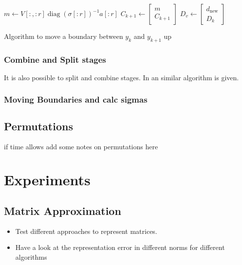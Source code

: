 \documentclass[doctype=mastersthesis,BCOR=15mm,biblatex]{ldvbook}%
\DeclareMathOperator{\diag}{diag}
\begin{document}
\begin{algorithm}[htb]
\begin{algorithmic}
\Else
\State $m \gets V[:,:r] \diag(\sigma[:r])^{-1} a[:r]$
\State $C_{k+1} \gets \begin{bmatrix} m\\C_{k+1} \end{bmatrix}$
\EndIf
\State $D_v \gets \begin{bmatrix}
d_{\text{new}} \\D_k
\end{bmatrix}$
	\end{algorithmic}
	\caption{Algorithm to move a boundary between $y_k$ and $y_{k+1}$ up}\label{alg:move_up}
\end{algorithm}

\subsection{Combine and Split stages}
It is also possible to split and combine stages. In \cite{chandrasekaran_fast_2005} an similar algorithm is given.

\subsection{Moving Boundaries and calc sigmas}\label{subsec:move_sig}

\section{Permutations}
if time allows add some notes on permutations here



\chapter{Experiments}



\section{Matrix Approximation}
\begin{itemize}
\item Test different approaches to represent matrices.
\item Have a look at the representation error in different norms for different algorithms
\end{itemize}
\end{document}
